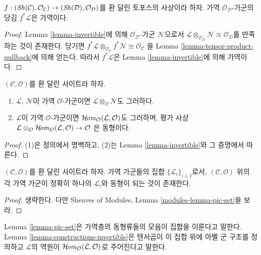 \begin{lemma}
\label{lemma-pullback-invertible}
$f : (\mathop{\mathit{Sh}}\nolimits(\mathcal{C}), \mathcal{O}_\mathcal{C}) \to
(\mathop{\mathit{Sh}}\nolimits(\mathcal{D}), \mathcal{O}_\mathcal{D})$를 환 달린 토포스의 사상이라
하자. 가역 $\mathcal{O}_\mathcal{D}$-가군의 당김 $f^*\mathcal{L}$은 가역이다.
\end{lemma}

\begin{proof}
Lemma \ref{lemma-invertible}에 의해 $\mathcal{O}_\mathcal{D}$-가군
$\mathcal{N}$으로서
$\mathcal{L} \otimes_{\mathcal{O}_\mathcal{D}} \mathcal{N} \cong
\mathcal{O}_\mathcal{D}$를 만족하는 것이 존재한다. 당기면
$f^*\mathcal{L} \otimes_{\mathcal{O}_\mathcal{C}} f^*\mathcal{N} \cong
\mathcal{O}_\mathcal{C}$
을 Lemma \ref{lemma-tensor-product-pullback}에 의해 얻는다. 따라서
$f^*\mathcal{L}$은 Lemma \ref{lemma-invertible}에 의해 가역이다.
\end{proof}

\begin{lemma}
\label{lemma-constructions-invertible}
$(\mathcal{C}, \mathcal{O})$를 환 달린 사이트라 하자.
\begin{enumerate}
\item $\mathcal{L}$, $\mathcal{N}$이 가역 $\mathcal{O}$-가군이면
$\mathcal{L} \otimes_\mathcal{O} \mathcal{N}$도 그러하다.
\item $\mathcal{L}$이 가역 $\mathcal{O}$-가군이면
$\mathop{\mathcal{H}\!\mathit{om}}\nolimits_\mathcal{O}(\mathcal{L}, \mathcal{O})$도 그러하며, 평가 사상
$\mathcal{L} \otimes_\mathcal{O}
\mathop{\mathcal{H}\!\mathit{om}}\nolimits_\mathcal{O}(\mathcal{L}, \mathcal{O}) \to \mathcal{O}$
은 동형이다.
\end{enumerate}
\end{lemma}

\begin{proof}
(1)은 정의에서 명백하고, (2)는 Lemma \ref{lemma-invertible}와 그 증명에서
따른다.
\end{proof}

\begin{lemma}
\label{lemma-pic-set}
$(\mathcal{C}, \mathcal{O})$를 환 달린 사이트라 하자. 가역 가군들의 집합
$\{\mathcal{L}_i\}_{i \in I}$로서, $(\mathcal{C}, \mathcal{O})$ 위의 각 가역
가군이 정확히 하나의 $\mathcal{L}_i$와 동형이 되는 것이 존재한다.
\end{lemma}

\begin{proof}
생략한다. 다만 Sheaves of Modules, Lemma \ref{modules-lemma-pic-set}을 보라.
\end{proof}

\noindent
Lemma \ref{lemma-pic-set}은 가역층의 동형류들의 모음이 집합을 이룬다고
말한다. Lemma \ref{lemma-constructions-invertible}은 텐서곱이 이 집합 위에
아벨 군 구조를 정의하고 $\mathcal{L}$의 역원이
$\mathop{\mathcal{H}\!\mathit{om}}\nolimits_\mathcal{O}(\mathcal{L}, \mathcal{O})$로 주어진다고 말한다.

